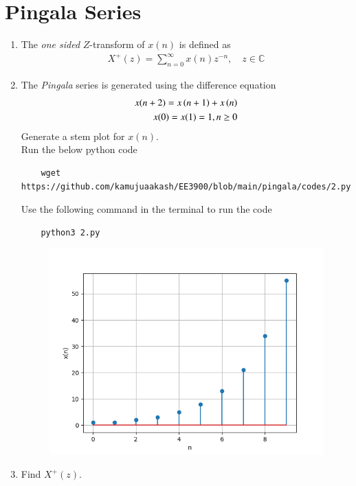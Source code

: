 \documentclass[journal,12pt,twocolumn]{IEEEtran}
\renewcommand\thesection{\arabic{section}}
\begin{document}
\section{Pingala Series}
\begin{enumerate}[label=\thesection.\arabic*,ref=\thesection.\theenumi]
\item The {\em one sided} $Z$-transform of $x(n)$ is defined as 
\begin{align}
	X^{+}(z) = \sum_{n = 0}^{\infty}x(n)z^{-n}, \quad z \in \mathbb{C}
	\label{eq:one-Z}
\end{align}
\item The {\em Pingala} series is generated using the difference equation 
\begin{align*}
	x(n+2) = x\left(n+1\right) + x\left(n\right)\\
	x(0) = x(1) = 1, n \ge 0
	\label{eq:10-pingala}
\end{align*}
Generate a stem plot for $x(n)$.\\
\solution
Run the below python code 
\begin{lstlisting}
	wget https://github.com/kamujuaakash/EE3900/blob/main/pingala/codes/2.py
\end{lstlisting}
Use the following command in the terminal to run the code
\begin{lstlisting}
	python3 2.py
\end{lstlisting}
\begin{figure}[ht!]
	\centering
	\includegraphics[width=\columnwidth]{./figs/2_2.png}
	\caption{}
\end{figure}
\item Find $X^{+}(z)$.\\

\end{enumerate}
\end{document}
